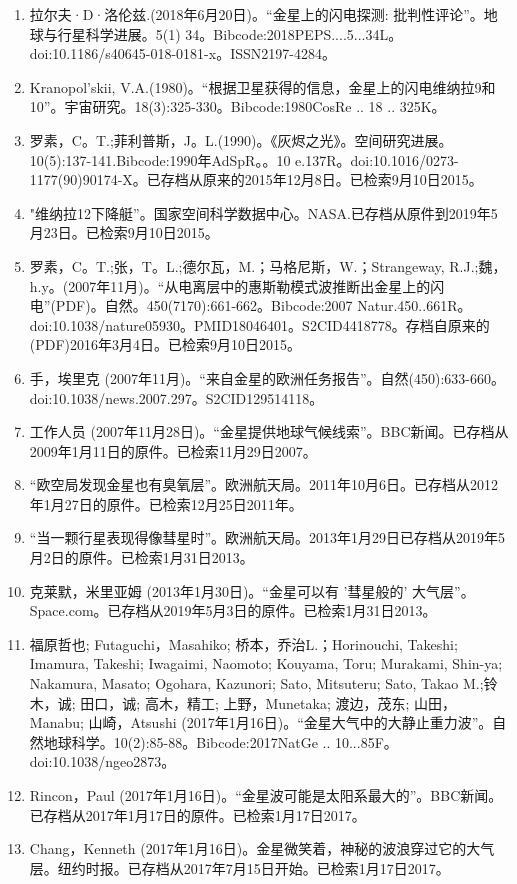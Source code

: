 \begin{enumerate}
\item 拉尔夫·D·洛伦兹.(2018年6月20日)。“金星上的闪电探测: 批判性评论”。地球与行星科学进展。5(1) 34。Bibcode:2018PEPS....5...34L。doi:10.1186/s40645-018-0181-x。ISSN2197-4284。 
\item Kranopol'skii, V.A.(1980)。“根据卫星获得的信息，金星上的闪电维纳拉9和10”。宇宙研究。18(3):325-330。Bibcode:1980CosRe .. 18 .. 325K。
\item 罗素，C。T.;菲利普斯，J。L.(1990)。《灰烬之光》。空间研究进展。10(5):137-141.Bibcode:1990年AdSpR。。10 e.137R。doi:10.1016/0273-1177(90)90174-X。已存档从原来的2015年12月8日。已检索9月10日2015。
\item "维纳拉12下降艇”。国家空间科学数据中心。NASA.已存档从原件到2019年5月23日。已检索9月10日2015。
\item 罗素，C。T.;张，T。L.;德尔瓦，M.；马格尼斯，W.；Strangeway, R.J.;魏，h.y。(2007年11月)。“从电离层中的惠斯勒模式波推断出金星上的闪电”(PDF)。自然。450(7170):661-662。Bibcode:2007 Natur.450..661R。doi:10.1038/nature05930。PMID18046401。S2CID4418778。存档自原来的(PDF)2016年3月4日。已检索9月10日2015。   
\item 手，埃里克 (2007年11月)。“来自金星的欧洲任务报告”。自然(450):633-660。doi:10.1038/news.2007.297。S2CID129514118。 
\item 工作人员 (2007年11月28日)。“金星提供地球气候线索”。BBC新闻。已存档从2009年1月11日的原件。已检索11月29日2007。
\item “欧空局发现金星也有臭氧层”。欧洲航天局。2011年10月6日。已存档从2012年1月27日的原件。已检索12月25日2011年。
\item “当一颗行星表现得像彗星时”。欧洲航天局。2013年1月29日已存档从2019年5月2日的原件。已检索1月31日2013。
\item 克莱默，米里亚姆 (2013年1月30日)。“金星可以有 '彗星般的' 大气层”。Space.com。已存档从2019年5月3日的原件。已检索1月31日2013。
\item 福原哲也; Futaguchi，Masahiko; 桥本，乔治L.；Horinouchi, Takeshi; Imamura, Takeshi; Iwagaimi, Naomoto; Kouyama, Toru; Murakami, Shin-ya; Nakamura, Masato; Ogohara, Kazunori; Sato, Mitsuteru; Sato, Takao M.;铃木，诚; 田口，诚; 高木，精工; 上野，Munetaka; 渡边，茂东; 山田，Manabu; 山崎，Atsushi (2017年1月16日)。“金星大气中的大静止重力波”。自然地球科学。10(2):85-88。Bibcode:2017NatGe .. 10...85F。doi:10.1038/ngeo2873。
\item Rincon，Paul (2017年1月16日)。“金星波可能是太阳系最大的”。BBC新闻。已存档从2017年1月17日的原件。已检索1月17日2017。
\item Chang，Kenneth (2017年1月16日)。金星微笑着，神秘的波浪穿过它的大气层。纽约时报。已存档从2017年7月15日开始。已检索1月17日2017。

\end{enumerate}
